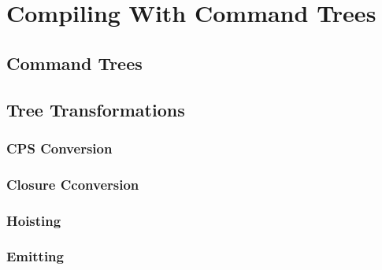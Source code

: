 
\chapter{\label{chap:treecomp}Compiling With Command Trees}
\section{\label{section:commandtree}Command Trees}
\section{\label{section:treetransforms}Tree Transformations}
\subsection{\label{subsection:cpsconvert}CPS Conversion}
\subsection{\label{section:closconvert}Closure Cconversion}
\subsection{\label{subsection:hoist}Hoisting}
\subsection{\label{section:emit}Emitting}
